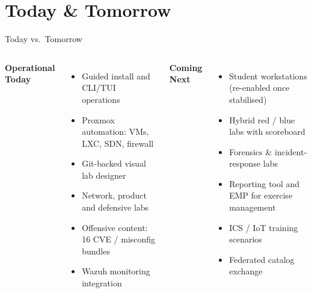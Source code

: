 \documentclass[aspectratio=169]{beamer}
\begin{document}
\section{Today \& Tomorrow}

\begin{frame}{Today vs.\ Tomorrow}
  \begin{columns}[T]
    {\textbf{\faCheckCircle\; Operational Today}}
    \begin{itemize}
      \item Guided install and CLI/TUI operations
      \item Proxmox automation: VMs, LXC, SDN, firewall
      \item Git-backed visual lab designer
      \item Network, product and defensive labs
      \item Offensive content: 16 CVE / misconfig bundles
      \item Wazuh monitoring integration
    \end{itemize}

    {\textbf{\faRocket\; Coming Next}}
    \begin{itemize}
      \item Student workstations (re-enabled once stabilised)
      \item Hybrid red / blue labs with scoreboard
      \item Forensics \& incident-response labs
      \item Reporting tool and EMP for exercise management
      \item ICS / IoT training scenarios
      \item Federated catalog exchange
    \end{itemize}
  \end{columns}
\end{frame}
\end{document}
